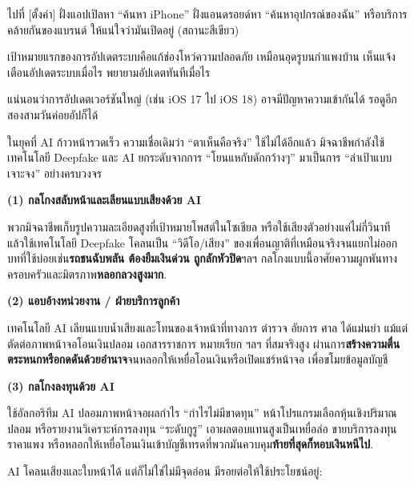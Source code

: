 ไปที่ [ตั้งค่า] ฝั่งแอปเปิลหา “ค้นหา iPhone” ฝั่งแอนดรอยด์หา “ค้นหาอุปกรณ์ของฉัน” หรือบริการคล้ายกันของแบรนด์ ให้แน่ใจว่ามันเปิดอยู่ (สถานะสีเขียว)


เป้าหมายแรกของการอัปเดตระบบคือแก้ช่องโหว่ความปลอดภัย เหมือนอุดรูบนกำแพงบ้าน เห็นแจ้งเตือนอัปเดตระบบเมื่อไร พยายามอัปเดตทันทีเมื่อไร

แน่นอนว่าการอัปเดตเวอร์ชันใหญ่ (เช่น iOS 17 ไป iOS 18) อาจมีปัญหาความเข้ากันได้ รอดูอีกสองสามวันค่อยอัปก็ได้


ในยุคที่ AI ก้าวหน้ารวดเร็ว ความเชื่อเดิมว่า “ตาเห็นคือจริง” ใช้ไม่ได้อีกแล้ว มิจฉาชีพกำลังใช้เทคโนโลยี Deepfake และ AI ยกระดับจากการ “โยนแหกับดักกว้างๆ” มาเป็นการ “ล่าเป้าแบบเจาะจง” อย่างครบวงจร


\textbf{(1) กลโกงสลับหน้าและเลียนแบบเสียงด้วย AI}\par

พวกมิจฉาชีพเก็บรูปความละเอียดสูงที่เป้าหมายโพสต์ในโซเชียล หรือใช้เสียงตัวอย่างแค่ไม่กี่วินาที แล้วใช้เทคโนโลยี Deepfake โคลนเป็น “วิดีโอ/เสียง” ของเพื่อนญาติที่เหมือนจริงจนแยกไม่ออก บทที่ใช้บ่อยเช่น\textbf{รถชนฉับพลัน ต้องยืมเงินด่วน ถูกลักหัวปิด}ฯลฯ กลโกงแบบนี้อาศัยความผูกพันทางครอบครัวและมิตรภาพ\textbf{หลอกลวงสูงมาก}.

\textbf{(2) แอบอ้างหน่วยงาน / ฝ่ายบริการลูกค้า}\par

เทคโนโลยี AI เลียนแบบน้ำเสียงและโทนของเจ้าหน้าที่ทางการ ตำรวจ อัยการ ศาล ได้แม่นยำ แม้แต่ตัดต่อภาพหน้าจอโอนเงินปลอม เอกสารราชการ หมายเรียก ฯลฯ ที่สมจริงสูง ผ่านการ\textbf{สร้างความตื่นตระหนกหรือกดดันด้วยอำนาจ}จนหลอกให้เหยื่อโอนเงินหรือเปิดแชร์หน้าจอ เพื่อขโมยข้อมูลบัญชี

\textbf{(3) กลโกงลงทุนด้วย AI}\par

ใช้อัลกอริทึม AI ปลอมภาพหน้าจอผลกำไร “กำไรไม่มีขาดทุน” หน้าโปรแกรมเลือกหุ้นเชิงปริมาณปลอม หรือรายงานวิเคราะห์การลงทุน “ระดับกูรู” เอาผลตอบแทนสูงเป็นเหยื่อล่อ ขายบริการลงทุนราคาแพง หรือหลอกให้เหยื่อโอนเงินเข้าบัญชีเทรดที่พวกมันควบคุม\textbf{ท้ายที่สุดก็หอบเงินหนีไป}.


AI โคลนเสียงและใบหน้าได้ แต่ก็ไม่ใช่ไม่มีจุดอ่อน มีรอยต่อให้ใช้ประโยชน์อยู่:

